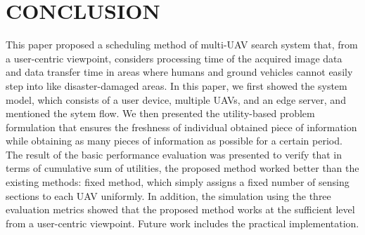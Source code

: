 \documentclass{ieeeaccess}
\begin{document}
\section{CONCLUSION}
This paper proposed a scheduling method of multi-UAV search system that, from a user-centric viewpoint, considers processing time of the acquired image data and data transfer time in areas where humans and ground vehicles cannot easily step into like disaster-damaged areas.
In this paper, we first showed the system model, which consists of a user device, multiple UAVs, and an edge server, and mentioned the sytem flow. 
We then presented the utility-based problem formulation that ensures the freshness of individual obtained piece of information while obtaining as many pieces of information as possible for a certain period.
The result of the basic performance evaluation was presented to verify that in terms of cumulative sum of utilities, the proposed method worked better than the existing methods: fixed method, which simply assigns a fixed number of sensing sections to each UAV uniformly.
In addition, the simulation using the three evaluation metrics showed that the proposed method works at the sufficient level from a user-centric viewpoint.
Future work includes the practical implementation.

\appendices
\end{document}
